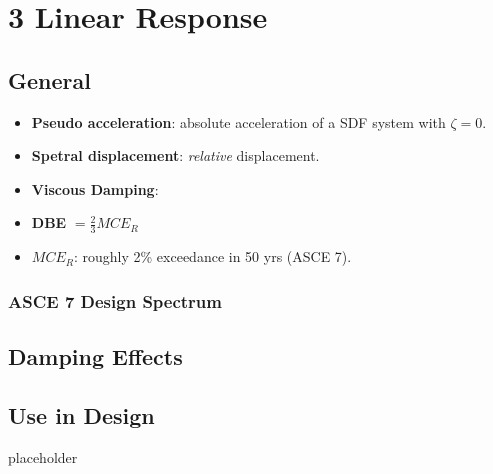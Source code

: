 \hypertarget{linear-response}{%
\section{3 Linear Response}\label{linear-response}}

\hypertarget{general}{%
\subsection{General}\label{general}}

\begin{itemize}
\tightlist
\item
  \textbf{Pseudo acceleration}: absolute acceleration of a SDF system
  with \(\zeta=0\).
\item
  \textbf{Spetral displacement}: \emph{relative} displacement.
\item
  \textbf{Viscous Damping}:
\item
  \textbf{DBE} \(= \frac{2}{3}MCE_R\)
\item
  \(MCE_R\): roughly 2\% exceedance in 50 yrs (ASCE 7).
\end{itemize}

\hypertarget{asce-7-design-spectrum}{%
\subsubsection{ASCE 7 Design Spectrum}\label{asce-7-design-spectrum}}

\hypertarget{damping-effects}{%
\subsection{Damping Effects}\label{damping-effects}}

\hypertarget{use-in-design}{%
\subsection{Use in Design}\label{use-in-design}}

placeholder
